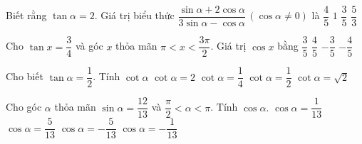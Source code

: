 \begin{ex}%
	Biết rằng $\tan \alpha = 2$. Giá trị biểu  thức $\dfrac{\sin \alpha +2 \cos \alpha}{3\sin \alpha - \cos \alpha}\, (\cos \alpha \ne 0)$ là
	\choice 
		 {$\dfrac{4}{5}$}
		{$1$} 
		{$\dfrac{3}{5}$} 
		{\True $\dfrac{5}{3}$} 
\end{ex}

\begin{ex}%
	Cho $\tan x=\dfrac{3}{4}$ và  góc $x$ thỏa mãn $\pi<x<\dfrac{3\pi}{2}$. Giá trị $\cos x$ bằng
	\choice 
		{$\dfrac{3}{5}$} 
		{$\dfrac{4}{5}$} 
		 {$-\dfrac{3}{5}$}
		{\True  $-\dfrac{4}{5}$}
\end{ex}

\begin{ex}%
	Cho biết $\tan\alpha=\dfrac{1}{2}$. Tính  $\cot\alpha $
	 \choice
		{\True $\cot\alpha=2$} 
		{$\cot\alpha=\dfrac{1}{4}$} 
		{$\cot\alpha=\dfrac{1}{2}$} 
		 {$\cot\alpha=\sqrt{2}$}
\end{ex}

\begin{ex}%
	Cho góc $\alpha $ thỏa mãn $\sin \alpha =\dfrac{{12}}{{13}}$ và $\dfrac{\pi}{2}<\alpha <\pi $. Tính $\cos \alpha.$ 
	 \choice
		 {$\cos \alpha =\dfrac{1}{{13}}$}
		{$\cos  \alpha =\dfrac{5}{{13}}$}
		{$\cos \alpha  =-\dfrac{5}{{13}}$}
		{\True  $\cos \alpha =-\dfrac{1}{{13}}$}
\end{ex}

